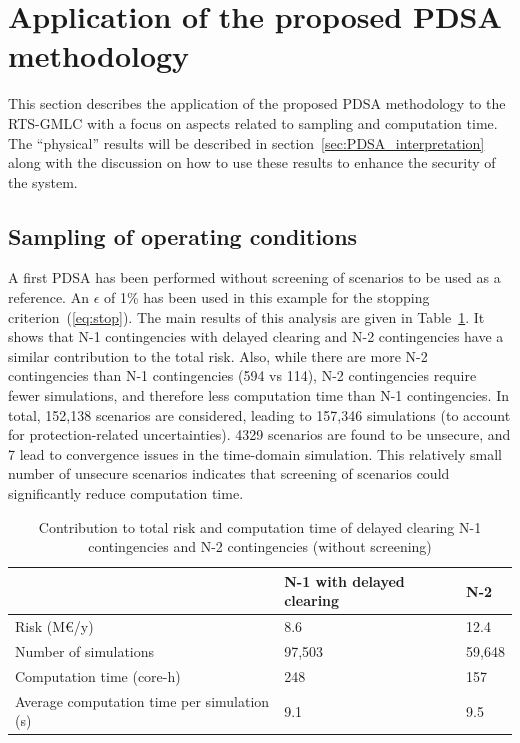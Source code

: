 \section{Application of the proposed PDSA methodology}
\label{sec:PDSA_results}

This section describes the application of the proposed PDSA methodology to the RTS-GMLC with a focus on aspects related to sampling and computation time. The ``physical'' results will be described in section~\ref{sec:PDSA_interpretation} along with the discussion on how to use these results to enhance the security of the system.



\subsection{Sampling of operating conditions}
\label{sec:PDSA_results_sampling}

A first PDSA has been performed without screening of scenarios to be used as a reference. An \(\epsilon\) of 1\% has been used in this example for the stopping criterion~(\ref{eq:stop}). The main results of this analysis are given in Table~\ref{tab:summary-N1N2}. It shows that N-1 contingencies with delayed clearing and N-2 contingencies have a similar contribution to the total risk. Also, while there are more N-2 contingencies than N-1 contingencies (594 vs 114), N-2 contingencies require fewer simulations, and therefore less computation time than N-1 contingencies. In total, 152,138 scenarios are considered, leading to 157,346 simulations (to account for protection-related uncertainties). 4329 scenarios are found to be unsecure, and 7 lead to convergence issues in the time-domain simulation. This relatively small number of unsecure scenarios indicates that screening of scenarios could significantly reduce computation time.

\begin{table}
\centering
\caption{Contribution to total risk and computation time of delayed clearing N-1 contingencies and N-2 contingencies (without screening)}
\label{tab:summary-N1N2}
\begin{tabular}{@{}lll@{}}
\toprule
                                 & N-1 with delayed clearing  & N-2 \\ \midrule
Risk (M€/y) & 8.6 & 12.4 \\
Number of simulations            & 97,503 & 59,648 \\
Computation time (core-h)        & 248  & 157 \\
Average computation time per simulation (s) & 9.1 & 9.5 \\ \bottomrule
\end{tabular}
\end{table}


